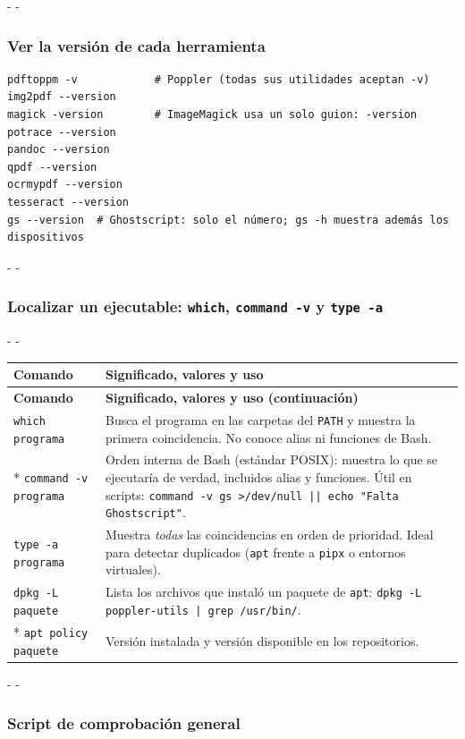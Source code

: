 \documentclass[11pt,a4paper]{article}
\makeatletter
\newcommand{\necesitaespacio}[1]{\par\penalty-100\begingroup
	\setlength{\dimen@}{#1}\dimen@ii\pagegoal\advance\dimen@ii-\pagetotal
	\ifdim\dimen@>\dimen@ii\ifdim\dimen@ii>\z@\vfil\fi\penalty-\@M\fi\endgroup}
\newenvironment{opciones}[1][Opción]{%
	\par\begingroup\small
	\begin{longtable}{L{4.25cm}L{11.2cm}}
		\toprule\rowcolor{tablacab}\cab{#1} & \cab{Significado, valores y uso} \\ \midrule
		\endfirsthead
		\toprule\rowcolor{tablacab}\cab{#1} & \cab{Significado, valores y uso (continuación)} \\ \midrule
		\endhead
		\bottomrule
		\endfoot}
	{\end{longtable}\endgroup}
\newcommand{\cmd}[1]{\texttt{\textcolor{colcmd}{#1}}}      %
\newcommand{\cab}[1]{\textbf{#1}}
\makeatother
\begin{document}
	\necesitaespacio{6\baselineskip}
	\subsubsection{Ver la versión de cada herramienta}
	
	\begin{lstlisting}
pdftoppm -v            # Poppler (todas sus utilidades aceptan -v)
img2pdf --version
magick -version        # ImageMagick usa un solo guion: -version
potrace --version
pandoc --version
qpdf --version
ocrmypdf --version
tesseract --version
gs --version  # Ghostscript: solo el número; gs -h muestra además los dispositivos
\end{lstlisting}
	
	\necesitaespacio{26\baselineskip}
	\subsubsection{Localizar un ejecutable: \texttt{which}, \texttt{command -v} y \texttt{type -a}}
	
	\necesitaespacio{22\baselineskip}
	\begin{opciones}[Comando]
		\cmd{which programa} & Busca el programa en las carpetas del \texttt{PATH} y muestra la primera coincidencia. No conoce alias ni funciones de Bash.\\*
		\cmd{command -v programa} & Orden interna de Bash (estándar POSIX): muestra lo que se ejecutaría de verdad, incluidos alias y funciones. Útil en scripts: \cmd{command -v gs >/\allowbreak{}dev/\allowbreak{}null |\allowbreak{}| echo "Falta Ghostscript"}.\\
		\cmd{type -a programa} & Muestra \emph{todas} las coincidencias en orden de prioridad. Ideal para detectar duplicados (\cmd{apt} frente a \cmd{pipx} o entornos virtuales).\\
		\cmd{dpkg -L paquete} & Lista los archivos que instaló un paquete de \cmd{apt}: \cmd{dpkg -L poppler-\allowbreak{}utils | grep /\allowbreak{}usr/\allowbreak{}bin/}.\\*
		\cmd{apt policy paquete} & Versión instalada y versión disponible en los repositorios.\\
	\end{opciones}
	
	\necesitaespacio{6\baselineskip}
	\subsubsection{Script de comprobación general}
	
\end{document}
